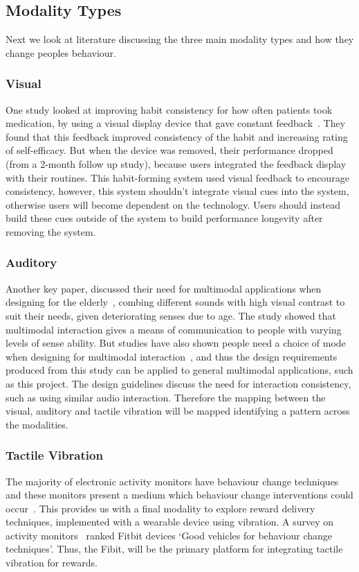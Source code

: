 \subsection{Modality Types}
Next we look at literature discussing the three main modality types and how they change peoples behaviour.

\subsubsection*{Visual}
One study looked at improving habit consistency for how often patients took medication, by using a visual display device that gave constant feedback~\cite{article_realtime_feedback_improving_medication_taking}. They found that this feedback improved consistency of the habit and increasing rating of self-efficacy. But when the device was removed, their performance dropped (from a 2-month follow up study), because users integrated the feedback display with their routines. This habit-forming system used visual feedback to encourage consistency, however, this system shouldn't integrate visual cues into the system, otherwise users will become dependent on the technology. Users should instead build these cues outside of the system to build performance longevity after removing the system.

\subsubsection*{Auditory}
Another key paper, discussed their need for multimodal applications when designing for the elderly~\cite{article_movipill_improving_medication_elders}, combing different sounds with high visual contrast to suit their needs, given deteriorating senses due to age. The study showed that multimodal interaction gives a means of communication to people with varying levels of sense ability. But studies have also shown people need a choice of mode when designing for multimodal interaction~\cite{article_user_centred_multimodal_reminders}, and thus the design requirements produced from this study can be applied to general multimodal applications, such as this project. The design guidelines discuss the need for interaction consistency, such as using similar audio interaction. Therefore the mapping between the visual, auditory and tactile vibration will be mapped identifying a pattern across the modalities.

\subsubsection*{Tactile Vibration}
The majority of electronic activity monitors have behaviour change techniques and these monitors present a medium which behaviour change interventions could occur~\cite{article_wearable_good}. This provides us with a final modality to explore reward delivery techniques, implemented with a wearable device using vibration. A survey on activity monitors~\cite{article_wearable_good} ranked Fitbit devices `Good vehicles for behaviour change techniques'. Thus, the Fibit, will be the primary platform for integrating tactile vibration for rewards.

